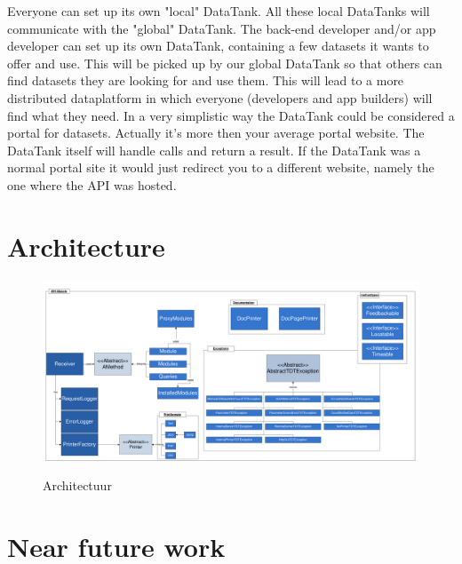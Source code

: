 \documentclass[12pt]{book}
\begin{document}
Everyone can set up its own "local" DataTank. All these local DataTanks will communicate with the "global" DataTank. The back-end developer and/or app developer can set up its own DataTank, containing a few datasets it wants to offer and use. This will be picked up by our global DataTank so that others can find datasets they are looking for and use them. This will lead to a more distributed dataplatform in which everyone (developers and app builders) will find what they need. In a very simplistic way the DataTank could be considered a portal for datasets. Actually it's more then your average portal website. The DataTank itself will handle calls and return a result. If the DataTank was a normal portal site it would just redirect you to a different website, namely the one where the API was hosted.

\chapter{Architecture}
\begin{figure}
  \centering
  \scalebox{0.4}
           {\includegraphics{graphics/UMLModelTDT.pdf}}
           \caption{Architectuur}
           \label{fig:Architectuur}
\end{figure}
\chapter{Near future work}
\end{document}
